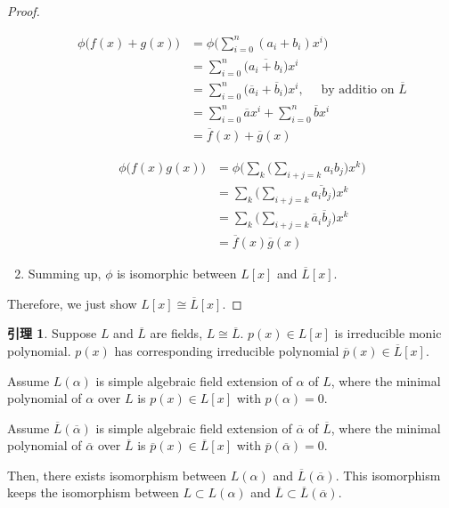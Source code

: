 \documentclass[utf8]{ctexbook}
\theoremstyle{definition}
\newtheorem{lemma}{引理}[section]
\begin{document}
\begin{proof}
\begin{enumerate}
{\begin{align*}
\phi \big(f(x) + g(x) \big) &= \phi\big( \sum_{i=0} ^n (a_i + b_i) x^i   \big) \\
&= \sum_{i=0} ^n \big( \overline{a_i + b_i} \big) x^i \\
&=  \sum_{i=0} ^n \big( \overline{a}_i + \overline{b}_i \big) x^i , \quad  \mbox{ by additio on $\overline{L}$} \\
&= \sum_{i=0} ^n \overline{a} x^i + \sum_{i=0} ^n \overline{b} x^i  \\
&= \overline{f} (x) + \overline{g} (x)
\end{align*} 

\begin{align*}
\phi\big( f(x) g(x) \big) &= \phi \big( \sum_k \big( \sum_{i+j = k} a_i b_j \big) x^k \big) \\
&= \sum_k \big( \sum_{i+j = k} \overline{a_i b_j } \big) x^k \\
&= \sum_k \big( \sum_{i+j = k} \overline{a}_i \overline{b}_j  \big) x^k \\
& = \overline{f}(x) \overline{g}(x)
\end{align*}
}
\item{Summing up, $\phi$ is isomorphic between $L[x]$ and $\overline{L}[x]$.}
\end{enumerate}

Therefore, we just show $L[x] \cong \overline{L}[x]$.

\end{proof}

\begin{lemma}
\label{lemma_4_4_2_simple_extension_field_iso}
Suppose $L$ and $\overline{L}$ are fields, $ L \cong \overline{L}$. $p(x) \in L[x]$ is irreducible monic polynomial. $p(x)$ has corresponding irreducible polynomial $\overline{p}(x) \in \overline{L}[x] $.

Assume $L(\alpha)$ is simple algebraic field extension of $\alpha$ of $L$, where the minimal polynomial of $\alpha$ over $L$ is $p(x) \in L[x] $ with $p(\alpha)=0$.

Assume $\overline{L}( \overline{\alpha} )$ is simple algebraic field extension of $\overline{\alpha}$ of $\overline{L}$, where the minimal polynomial of $\overline{\alpha}$ over $\overline{L}$ is $\overline{p}(x) \in \overline{L} [x] $ with $\overline{p} ( \overline{\alpha})=0$.

Then, there exists isomorphism between $L(\alpha)$ and $\overline{L} (\overline{\alpha})$. This isomorphism keeps the isomorphism between $L \subset L(\alpha)$ and $\overline{L} \subset \overline{L}(\overline{\alpha})$.

\end{lemma}
\end{document}
